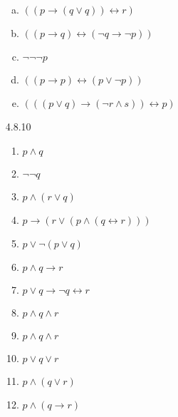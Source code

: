 \begin{enumerate}
\begin{enumerate}[(a)]
\item $((p\to (q\lor q))\leftrightarrow r)$



\item $((p\to q)\leftrightarrow (\neg q\to \neg p))$



\item $\neg\neg\neg p$



\item $(({p} \to {p}) \leftrightarrow ({p}\lor \neg {p}))$


\item $(((p\lor q)\to (\neg r\land s))\leftrightarrow {p})$

		
		\end{enumerate}
		
		\item[4.8.10] \
		
		\begin{enumerate}
		
			\item $p\land q$
		
			\item $\neg\neg q$
			
			\item $p\land (r\lor q)$
			
			\item $p\to (r\lor (p\land (q\leftrightarrow r)))$
			
			\item $p\lor \neg (p\lor q)$
			
			\item $p\land q\to r$
			
			\item $p\lor q\to \neg q\leftrightarrow r$
			
			\item $p\land q\land r$
			
			\item $p\land q\land r$
			
			\item $p\lor q\lor r$
			
			\item $p\land (q\lor r)$
			
			\item $p\land (q\to r)$
				
		\end{enumerate}
		
\end{enumerate}
	
